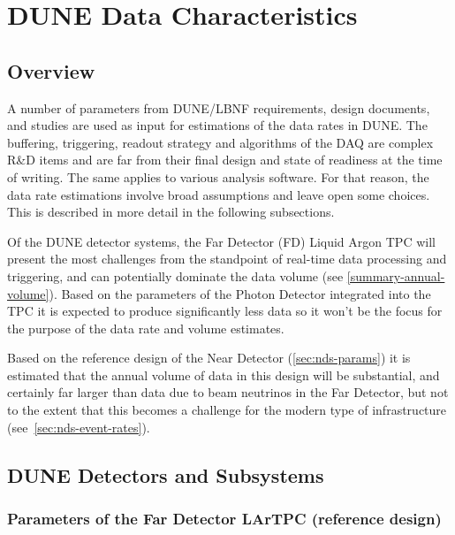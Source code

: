 \section{DUNE Data Characteristics}
\label{sec:data-characteristics}
\subsection{Overview}

A number of parameters from DUNE/LBNF requirements, design documents,  and studies are used  as input
for estimations of the data rates in DUNE.
The buffering, triggering, readout strategy and algorithms of the DAQ
are complex R\&D items and are far from their final design and state of
readiness at the time of writing.  The same applies to various analysis software.
For that reason, the data rate estimations involve broad assumptions
and leave open some choices. This is described in more detail in the following subsections.

Of the DUNE detector systems, the Far Detector (FD) Liquid Argon TPC will present the most
challenges from the standpoint of real-time data processing and triggering, and can potentially dominate the data volume
(see \ref{summary-annual-volume}).
Based on the parameters of the Photon Detector integrated into the TPC it is expected to produce
significantly less data so it won't be the focus for the purpose of the data rate and volume estimates.

Based on the reference design of the Near Detector (\ref{sec:nds-params}) it is estimated that
the annual volume of data in this design will be substantial, and certainly far larger than data due to beam
neutrinos in the Far Detector, but not to the extent that this becomes a challenge for the modern type of infrastructure
(see~\ref{sec:nds-event-rates}).

\subsection{DUNE Detectors and Subsystems}

\subsubsection{Parameters of the Far Detector LArTPC (reference design)}
\label{sec:fundamental-parameters}

